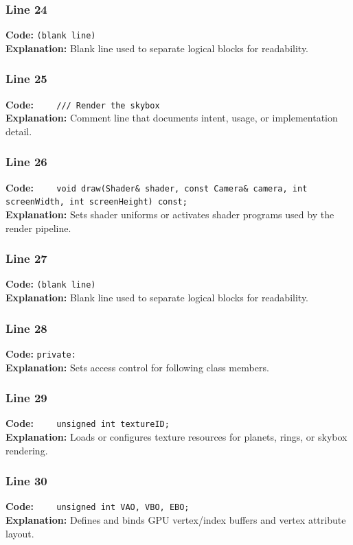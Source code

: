 \documentclass[11pt,a4paper]{article}
\begin{document}
\subsubsection*{Line 24}
\textbf{Code:} \texttt{(blank line)}\\
\textbf{Explanation:} Blank line used to separate logical blocks for readability.

\subsubsection*{Line 25}
\textbf{Code:} \verb|    /// Render the skybox|\\
\textbf{Explanation:} Comment line that documents intent, usage, or implementation detail.

\subsubsection*{Line 26}
\textbf{Code:} \verb|    void draw(Shader& shader, const Camera& camera, int screenWidth, int screenHeight) const;|\\
\textbf{Explanation:} Sets shader uniforms or activates shader programs used by the render pipeline.

\subsubsection*{Line 27}
\textbf{Code:} \texttt{(blank line)}\\
\textbf{Explanation:} Blank line used to separate logical blocks for readability.

\subsubsection*{Line 28}
\textbf{Code:} \verb|private:|\\
\textbf{Explanation:} Sets access control for following class members.

\subsubsection*{Line 29}
\textbf{Code:} \verb|    unsigned int textureID;|\\
\textbf{Explanation:} Loads or configures texture resources for planets, rings, or skybox rendering.

\subsubsection*{Line 30}
\textbf{Code:} \verb|    unsigned int VAO, VBO, EBO;|\\
\textbf{Explanation:} Defines and binds GPU vertex/index buffers and vertex attribute layout.
\end{document}

